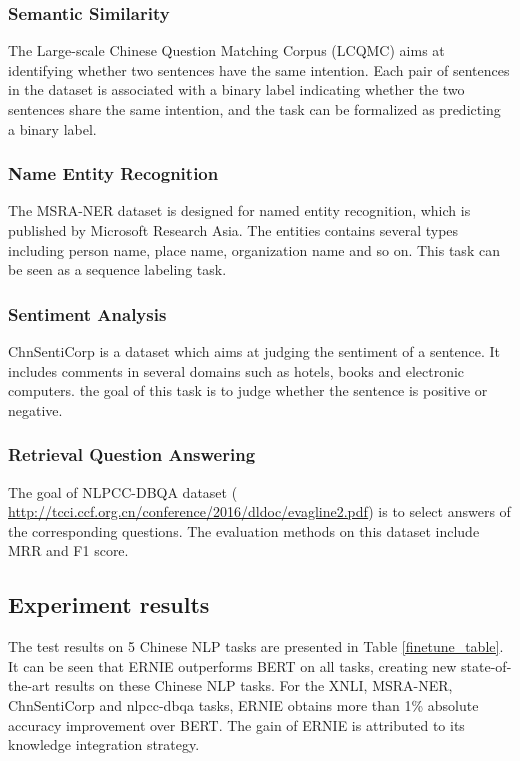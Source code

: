 \documentclass[11pt,a4paper]{article}
\begin{document}
\subsubsection{Semantic Similarity}
The Large-scale Chinese Question Matching Corpus (LCQMC) \cite{liu2018lcqmc} aims at identifying whether two sentences have the same intention. Each pair of sentences in the dataset is associated with a binary label indicating whether the two sentences share the same intention, and the task can be formalized as predicting a binary label.

\subsubsection{Name Entity Recognition}
The MSRA-NER dataset is designed for named entity recognition, which is published by Microsoft Research Asia. The entities contains several types including person name, place name, organization name and so on. This task can be seen as a sequence labeling task.

\subsubsection{Sentiment Analysis}
ChnSentiCorp \cite{song6chnsenticorp} is a dataset which aims at judging the sentiment of a sentence. It includes comments in several domains such as hotels, books and electronic computers. the goal of this task is to judge whether the sentence is positive or negative.

\subsubsection{Retrieval Question Answering}
The goal of NLPCC-DBQA dataset ( \url{http://tcci.ccf.org.cn/conference/2016/dldoc/evagline2.pdf}) is to select answers of the corresponding questions. The evaluation methods on this dataset include MRR \cite{voorhees2001overview} and F1 score.


\subsection{Experiment results}
The test results on 5 Chinese NLP tasks are presented in Table \ref{finetune_table}. It can be seen that ERNIE outperforms BERT on all tasks, creating new state-of-the-art results on these Chinese NLP tasks. For the XNLI, MSRA-NER, ChnSentiCorp and nlpcc-dbqa tasks, ERNIE obtains more than 1\% absolute accuracy improvement over BERT. The gain of ERNIE is attributed to its knowledge integration strategy. 
\end{document}
